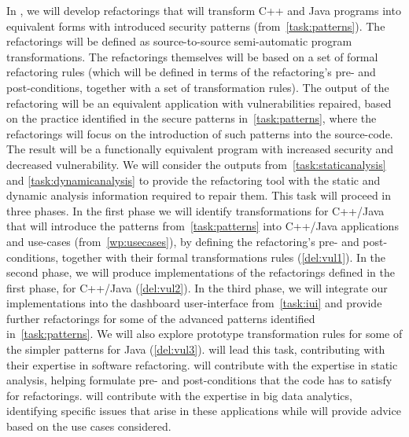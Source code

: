 \begin{Workpackage}{\thewpno}
\begin{Task}
In \theTask{}, we will develop refactorings that will transform C++ and Java programs into equivalent forms with introduced security patterns (from~\ref{task:patterns}). The refactorings will be defined as source-to-source semi-automatic program transformations. 
%
%
%
The refactorings themselves will be based on a set of formal refactoring rules (which will be defined in terms of the refactoring's pre- and post-conditions, together with a set of transformation rules). The output of the refactoring will be an equivalent application with vulnerabilities repaired, based on the practice identified in the secure patterns in~\ref{task:patterns}, where the refactorings will focus on the introduction of such patterns into the source-code. The result will be a functionally equivalent program with increased security and decreased vulnerability. %
We will consider the outputs from~\ref{task:staticanalysis} and \ref{task:dynamicanalysis} to provide the refactoring tool with the static and dynamic analysis information required to repair them.
%
%
This task will proceed in three phases. In the first phase we will identify transformations for C++/Java  that will introduce the patterns from~\ref{task:patterns} into C++/Java applications and use-cases (from~\ref{wp:usecases}), by defining the refactoring's  pre- and post-conditions, together with their formal transformations rules (\ref{del:vul1}). In the second phase, we will produce implementations of the refactorings defined in the first phase, for C++/Java (\ref{del:vul2}).
 In the third phase, we will integrate our implementations into the dashboard user-interface from~\ref{task:iui} and provide further refactorings for some of the advanced patterns identified in~\ref{task:patterns}.
We will also explore prototype transformation rules for some of the simpler patterns for Java (\ref{del:vul3}). \SAshort{} will lead this task, contributing with their expertise in software refactoring. \YAGshort{} will contribute with the expertise in static analysis, helping formulate pre- and post-conditions that the code has to satisfy for refactorings. \UODshort{} will contribute with the expertise in big data analytics, identifying specific issues that arise in these applications while \SOPRAshort{} will provide advice based on the use cases considered.


\end{Task}
\end{Workpackage}
